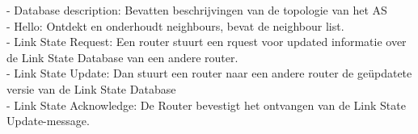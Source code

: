 - Database description: Bevatten beschrijvingen van de topologie van het AS\\
- Hello: Ontdekt en onderhoudt neighbours, bevat de neighbour list.\\
- Link State Request: Een router stuurt een rquest voor updated informatie over de Link State Database van een andere router.\\
- Link State Update: Dan stuurt een router naar een andere router de geüpdatete versie van de Link State Database\\
- Link State Acknowledge: De Router bevestigt het ontvangen van de Link State Update-message. 